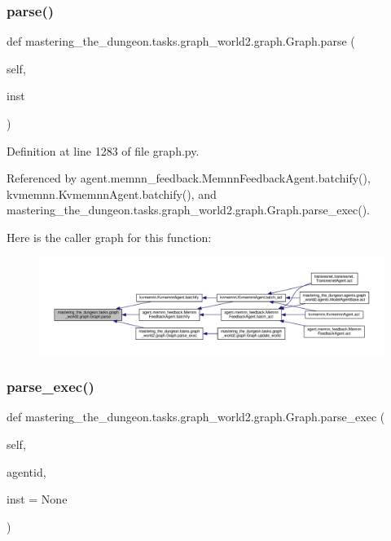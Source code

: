 \subsubsection{\texorpdfstring{parse()}{parse()}}
{\footnotesize\ttfamily def mastering\+\_\+the\+\_\+dungeon.\+tasks.\+graph\+\_\+world2.\+graph.\+Graph.\+parse (\begin{DoxyParamCaption}\item[{}]{self,  }\item[{}]{inst }\end{DoxyParamCaption})}



Definition at line 1283 of file graph.\+py.



Referenced by agent.\+memnn\+\_\+feedback.\+Memnn\+Feedback\+Agent.\+batchify(), kvmemnn.\+Kvmemnn\+Agent.\+batchify(), and mastering\+\_\+the\+\_\+dungeon.\+tasks.\+graph\+\_\+world2.\+graph.\+Graph.\+parse\+\_\+exec().

Here is the caller graph for this function\+:
\nopagebreak
\begin{figure}[H]
\begin{center}
\leavevmode
\includegraphics[width=350pt]{classmastering__the__dungeon_1_1tasks_1_1graph__world2_1_1graph_1_1Graph_ac0f86925261cb5f95202f17b41c2832f_icgraph}
\end{center}
\end{figure}
\mbox{\label{classmastering__the__dungeon_1_1tasks_1_1graph__world2_1_1graph_1_1Graph_a3e15de765a5c825f15f66737b2e9118e}} 
\subsubsection{\texorpdfstring{parse\+\_\+exec()}{parse\_exec()}}
{\footnotesize\ttfamily def mastering\+\_\+the\+\_\+dungeon.\+tasks.\+graph\+\_\+world2.\+graph.\+Graph.\+parse\+\_\+exec (\begin{DoxyParamCaption}\item[{}]{self,  }\item[{}]{agentid,  }\item[{}]{inst = {\ttfamily None} }\end{DoxyParamCaption})}

